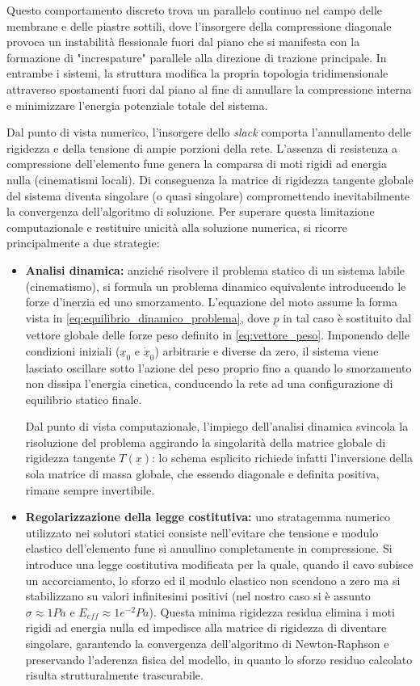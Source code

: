 Questo comportamento discreto trova un parallelo continuo nel campo delle membrane e delle piastre sottili, dove l'insorgere della compressione diagonale provoca un instabilità flessionale fuori dal piano che si manifesta con la formazione di "increspature" parallele alla direzione di trazione principale. In entrambe i sistemi, la struttura modifica la propria topologia tridimensionale attraverso spostamenti fuori dal piano al fine di annullare la compressione interna e minimizzare l'energia potenziale totale del sistema.

Dal punto di vista numerico, l'insorgere dello \textit{slack} comporta l'annullamento delle rigidezza e della tensione di ampie porzioni della rete. L'assenza di resistenza a compressione dell'elemento fune genera la comparsa di moti rigidi ad energia nulla (cinematismi locali). Di conseguenza la matrice di rigidezza tangente globale del sistema diventa singolare (o quasi singolare) compromettendo inevitabilmente la convergenza dell'algoritmo di soluzione. Per superare questa limitazione computazionale e restituire unicità alla soluzione numerica, si ricorre principalmente a due strategie: 

\begin{itemize}
   \item \textbf{Analisi dinamica:} anziché risolvere il problema statico di un sistema labile (cinematismo), si formula un problema dinamico equivalente introducendo le forze d'inerzia ed uno smorzamento. L'equazione del moto assume la forma vista in \cref{eq:equilibrio_dinamico_problema}, dove $\underline{p}$ in tal caso è sostituito dal vettore globale delle forze peso definito in \cref{eq:vettore_peso}. Imponendo delle condizioni iniziali ($\underline{x}_0$ e $\underline{\dot x}_0$) arbitrarie e diverse da zero, il sistema viene lasciato oscillare sotto l'azione del peso proprio fino a quando lo smorzamento non dissipa l'energia cinetica, conducendo la rete ad una configurazione di equilibrio statico finale.
   
   Dal punto di vista computazionale, l'impiego dell'analisi dinamica svincola la risoluzione del problema aggirando la singolarità della matrice globale di rigidezza tangente $T(\underline{x})$: lo schema esplicito richiede infatti l'inversione della sola matrice di massa globale, che essendo diagonale e definita positiva, rimane sempre invertibile.
   \item \textbf{Regolarizzazione della legge costitutiva:} uno stratagemma numerico utilizzato nei solutori statici consiste nell'evitare che tensione e modulo elastico dell'elemento fune si annullino completamente in compressione. Si introduce una legge costitutiva modificata per la quale, quando il cavo subisce un accorciamento, lo sforzo ed il modulo elastico non scendono a zero ma si stabilizzano su valori infinitesimi positivi (nel nostro caso si è assunto $\sigma \approx 1Pa$ e $E_{eff} \approx 1e^{-2}Pa$). Questa minima rigidezza residua elimina i moti rigidi ad energia nulla ed impedisce alla matrice di rigidezza di diventare singolare, garantendo la convergenza dell'algoritmo di Newton-Raphson e preservando l'aderenza fisica del modello, in quanto lo sforzo residuo calcolato risulta strutturalmente trascurabile.
\end{itemize}

